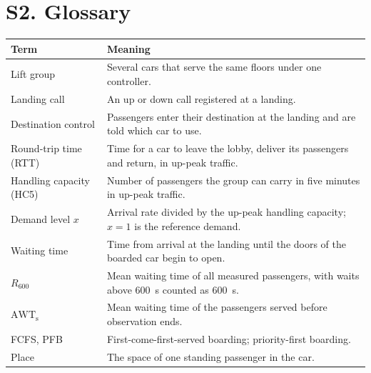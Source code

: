\documentclass[11pt]{article}
\begin{document}
\section*{S2. Glossary}
\begin{center}\small
\begin{tabular}{@{}p{.25\linewidth}p{.70\linewidth}@{}}
\toprule Term & Meaning\\\midrule
Lift group & Several cars that serve the same floors under one controller.\\
Landing call & An up or down call registered at a landing.\\
Destination control & Passengers enter their destination at the landing and are told which car to use.\\
Round-trip time (RTT) & Time for a car to leave the lobby, deliver its passengers and return, in up-peak traffic.\\
Handling capacity (HC5) & Number of passengers the group can carry in five minutes in up-peak traffic.\\
Demand level $x$ & Arrival rate divided by the up-peak handling capacity; $x=1$ is the reference demand.\\
Waiting time & Time from arrival at the landing until the doors of the boarded car begin to open.\\
$R_{600}$ & Mean waiting time of all measured passengers, with waits above 600~s counted as 600~s.\\
$\mathrm{AWT}_{\mathrm{s}}$ & Mean waiting time of the passengers served before observation ends.\\
FCFS, PFB & First-come-first-served boarding; priority-first boarding.\\
Place & The space of one standing passenger in the car.\\
\bottomrule
\end{tabular}
\end{center}
\end{document}
